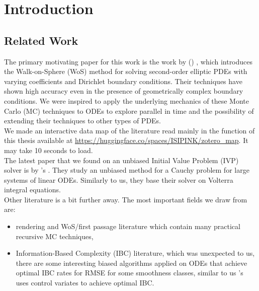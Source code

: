 \documentclass[a4paper,12pt]{article}
\begin{document}


\newpage
\tableofcontents
\newpage

\begin{abstract}
    
\end{abstract}


\section{Introduction}

\subsection{Related Work}
The primary motivating paper for this work is the work
by \citeauthor{sawhney_grid-free_2022}
(\citeyear{sawhney_grid-free_2022}) \cite{sawhney_grid-free_2022},
which introduces the Walk-on-Sphere (WoS) method for solving second-order
elliptic PDEs with varying coefficients and Dirichlet boundary conditions.
Their techniques have shown high accuracy even in the presence of geometrically
complex boundary conditions. We were inspired to apply the underlying
mechanics of these Monte Carlo (MC) techniques to ODEs to explore
parallel in time and the possibility of extending their techniques
to other types of PDEs. \\

We made an interactive data map of the literature read
mainly in the function of this thesis available at
\url{https://huggingface.co/spaces/ISIPINK/zotero_map}.
It may take 10 seconds to load. \\

The latest paper that we found on an unbiased Initial Value Problem (IVP) solver is by
\citeauthor{ermakov_monte_2021}'s \citeyear{ermakov_monte_2021}
\cite{ermakov_monte_2021}.  They study an unbiased method for
a Cauchy problem for large systems of linear ODEs.
Similarly to us, they base their solver on Volterra integral equations.\\

Other literature is a bit further away.
The most important fields we draw from are:

\begin{itemize}
    \item rendering and WoS/first passage literature
          which contain many practical recursive
          MC techniques,


    \item  Information-Based Complexity (IBC) literature, which was
          unexpected to us, there are some interesting
          biased algorithms applied on ODEs that achieve optimal
          IBC rates for RMSE for some smoothness classes, similar to us
          \citeauthor{daun_randomized_2011}'s \citeyear{daun_randomized_2011}
          \cite{daun_randomized_2011} uses control variates
          to achieve optimal IBC.
\end{itemize}
\end{document}
